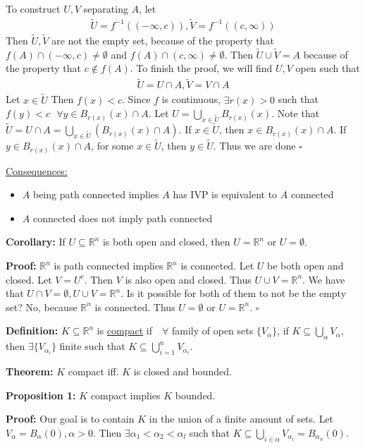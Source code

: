 \documentclass{article}
\newcommand*{\qed}{\hfill$\square$}%
\newcommand*{\txt}[1]{\text{ #1 }}%
\newcommand*{\fora}{\txt{}\forall}%
\newcommand*{\rr}{\mathbb{R}}%
\begin{document}
To construct $U,V$ separating $A$, let \begin{align*}
    \tilde{U}=f^{-1}((-\infty,c)), \tilde{V}=f^{-1}((c,\infty))
\end{align*}
Then $\tilde{U},\tilde{V}$ are not the empty set, because of the property that $f(A)\cap (-\infty,c)\neq \emptyset$ and $f(A)\cap (c,\infty)\neq \emptyset$. Then $\tilde{U}\cup \tilde{V}=A$ because of the property that $c\notin f(A)$. To finish the proof, we will find $U,V$ open such that \begin{align*}
    \tilde{U}=U\cap A,\tilde{V}=V\cap A
\end{align*}
Let $x\in \tilde{U}$ Then $f(x)<c$. Since $f$ is continuous, $\exists r(x)>0$ such that $f(y)<c \fora y\in B_{r(x)}(x)\cap A$. Let $U=\bigcup_{x\in \tilde{U}}B_{r(x)}(x)$. Note that $\tilde{U}=U\cap A=\bigcup_{x\in \tilde{U}}(B_{r(x)}(x)\cap A)$. If $x\in \tilde{U}$, then $x\in B_{r(x)}(x)\cap A$. If $y\in B_{r(x)}(x)\cap A$, for some $x\in \tilde{U}$, then $y\in \tilde{U}$. Thus we are done \qed 

\underline{Consequences:}\begin{itemize}
    \item $A$ being path connected implies $A$ has IVP is equivalent to $A$ connected 
    \item $A$ connected does not imply path connected
\end{itemize}

\textbf{Corollary:} If $U\subseteq \rr^n$ is both open and closed, then $U=\rr^n$ or $U=\emptyset$.

\textbf{Proof:} $\rr^n$ is path connected implies $\rr^n$ is connected. Let $U$ be both open and closed. Let $V=U^c$. Then $V$ is also open and closed. Thus $U\cup V=\rr^n$. We have that $U\cap V=\emptyset, U\cup V=\rr^n$. Is it possible for both of them to not be the empty set? No, because $\rr^n$ is connected. Thus $U=\emptyset$ or $U=\rr^n$. \qed

\textbf{Definition:} $K\subseteq \rr^n$ is \underline{compact} if $\fora$ family of open sets $\{V_\alpha\}$, if $K\subseteq \bigcup_{\alpha}V_\alpha$, then $\exists \{V_{\alpha_i}\}$ finite such that $K\subseteq \bigcup_{i=1}^n V_{\alpha_i}$.

\textbf{Theorem:} $K$ compact iff. $K$ is closed and bounded. 

\textbf{Proposition 1:} $K$ compact implies $K$ bounded. 

\textbf{Proof:} Our goal is to contain $K$ in the union of a finite amount of sets. Let $V_\alpha=B_\alpha(0), \alpha>0$. Then $\exists \alpha_1<\alpha_2<\alpha_l$ such that $K\subseteq \bigcup_{i\in\alpha}V_{\alpha_i}=B_{\alpha_n}(0)$.
\end{document}
